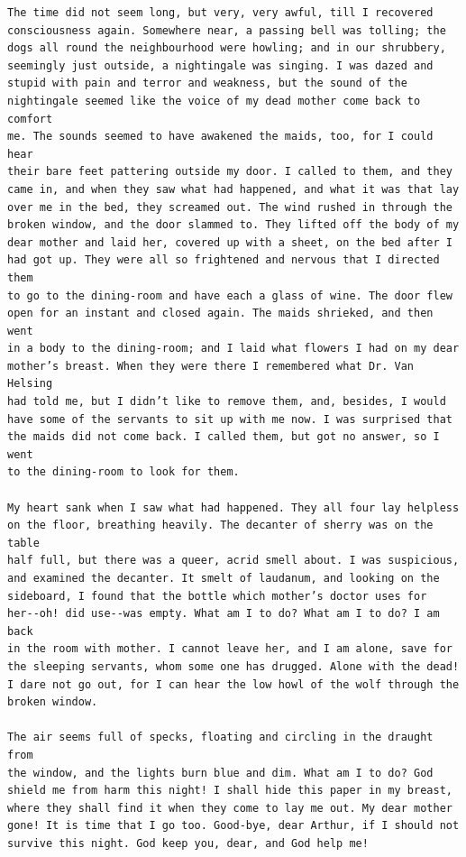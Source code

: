 \documentclass{article}
\begin{document}
\begin{verbatim}
The time did not seem long, but very, very awful, till I recovered
consciousness again. Somewhere near, a passing bell was tolling; the
dogs all round the neighbourhood were howling; and in our shrubbery,
seemingly just outside, a nightingale was singing. I was dazed and
stupid with pain and terror and weakness, but the sound of the
nightingale seemed like the voice of my dead mother come back to comfort
me. The sounds seemed to have awakened the maids, too, for I could hear
their bare feet pattering outside my door. I called to them, and they
came in, and when they saw what had happened, and what it was that lay
over me in the bed, they screamed out. The wind rushed in through the
broken window, and the door slammed to. They lifted off the body of my
dear mother and laid her, covered up with a sheet, on the bed after I
had got up. They were all so frightened and nervous that I directed them
to go to the dining-room and have each a glass of wine. The door flew
open for an instant and closed again. The maids shrieked, and then went
in a body to the dining-room; and I laid what flowers I had on my dear
mother’s breast. When they were there I remembered what Dr. Van Helsing
had told me, but I didn’t like to remove them, and, besides, I would
have some of the servants to sit up with me now. I was surprised that
the maids did not come back. I called them, but got no answer, so I went
to the dining-room to look for them.

My heart sank when I saw what had happened. They all four lay helpless
on the floor, breathing heavily. The decanter of sherry was on the table
half full, but there was a queer, acrid smell about. I was suspicious,
and examined the decanter. It smelt of laudanum, and looking on the
sideboard, I found that the bottle which mother’s doctor uses for
her--oh! did use--was empty. What am I to do? What am I to do? I am back
in the room with mother. I cannot leave her, and I am alone, save for
the sleeping servants, whom some one has drugged. Alone with the dead!
I dare not go out, for I can hear the low howl of the wolf through the
broken window.

The air seems full of specks, floating and circling in the draught from
the window, and the lights burn blue and dim. What am I to do? God
shield me from harm this night! I shall hide this paper in my breast,
where they shall find it when they come to lay me out. My dear mother
gone! It is time that I go too. Good-bye, dear Arthur, if I should not
survive this night. God keep you, dear, and God help me!





\end{verbatim}
\end{document}
